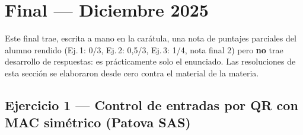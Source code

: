 \section{Final --- Diciembre 2025}

\begin{ojo}
Este final trae, escrita a mano en la carátula, una nota de puntajes parciales del
alumno rendido (Ej.\,1: 0/3, Ej.\,2: 0,5/3, Ej.\,3: 1/4, nota final 2) pero \textbf{no}
trae desarrollo de respuestas: es prácticamente solo el enunciado. Las resoluciones de
esta sección se elaboraron desde cero contra el material de la materia.
\end{ojo}

\subsection{Ejercicio 1 --- Control de entradas por QR con MAC simétrico (Patova SAS)}

